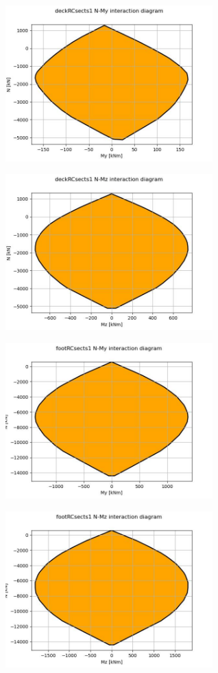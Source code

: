 
\begin{center}
\includegraphics[width=80mm]{results/graphics/sections/deckRCsects1NMy}
\end{center}
\begin{center}
\includegraphics[width=80mm]{results/graphics/sections/deckRCsects1NMz}
\end{center}

\begin{center}
\includegraphics[width=80mm]{results/graphics/sections/footRCsects1NMy}
\end{center}
\begin{center}
\includegraphics[width=80mm]{results/graphics/sections/footRCsects1NMz}
\end{center}
